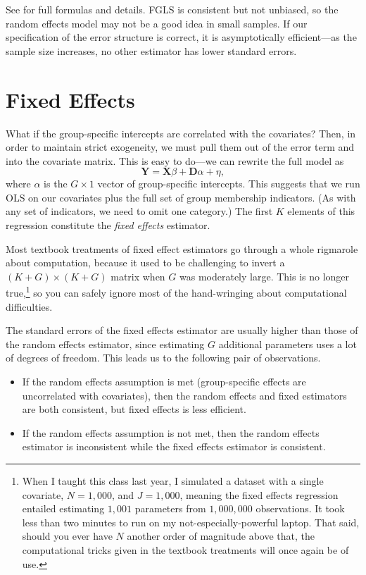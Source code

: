 \documentclass[12pt,oneside,openany]{book}
\begin{document}
See \citet[392--395]{Johnston:1997um} for full formulas and details.
FGLS is consistent but not unbiased, so the random effects model may not
be a good idea in small samples. If our specification of the error
structure is correct, it is asymptotically efficient---as the sample
size increases, no other estimator has lower standard errors.

\section{Fixed Effects}\label{fixed-effects}

What if the group-specific intercepts are correlated with the
covariates? Then, in order to maintain strict exogeneity, we must pull
them out of the error term and into the covariate matrix. This is easy
to do---we can rewrite the full model as \[
\mathbf{Y} = \mathbf{X} \beta + \mathbf{D} \alpha + \eta,
\] where \(\alpha\) is the \(G \times 1\) vector of group-specific
intercepts. This suggests that we run OLS on our covariates plus the
full set of group membership indicators. (As with any set of indicators,
we need to omit one category.) The first \(K\) elements of this
regression constitute the \emph{fixed effects} estimator.

Most textbook treatments of fixed effect estimators go through a whole
rigmarole about computation, because it used to be challenging to invert
a \((K + G) \times (K + G)\) matrix when \(G\) was moderately large.
This is no longer true,\footnote{When I taught this class last year, I
  simulated a dataset with a single covariate, \(N = 1{,}000\), and
  \(J = 1{,}000\), meaning the fixed effects regression entailed
  estimating \(1{,}001\) parameters from \(1{,}000{,}000\) observations.
  It took less than two minutes to run on my not-especially-powerful
  laptop. That said, should you ever have \(N\) another order of
  magnitude above that, the computational tricks given in the textbook
  treatments will once again be of use.} so you can safely ignore most
of the hand-wringing about computational difficulties.

The standard errors of the fixed effects estimator are usually higher
than those of the random effects estimator, since estimating \(G\)
additional parameters uses a lot of degrees of freedom. This leads us to
the following pair of observations.

\begin{itemize}
\item
  If the random effects assumption is met (group-specific effects are
  uncorrelated with covariates), then the random effects and fixed
  estimators are both consistent, but fixed effects is less efficient.
\item
  If the random effects assumption is not met, then the random effects
  estimator is inconsistent while the fixed effects estimator is
  consistent.
\end{itemize}
\end{document}
